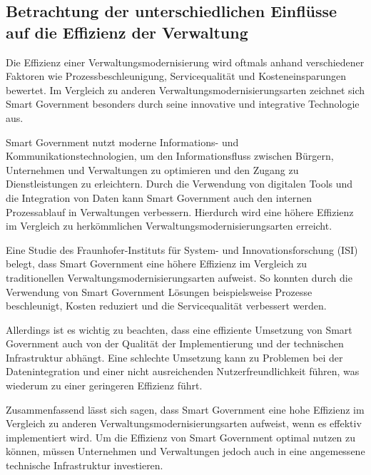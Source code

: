 \subsection{Betrachtung der unterschiedlichen Einflüsse auf die Effizienz der Verwaltung}
Die Effizienz einer Verwaltungsmodernisierung wird oftmals anhand verschiedener Faktoren wie Prozessbeschleunigung, Servicequalität und Kosteneinsparungen bewertet.
Im Vergleich zu anderen Verwaltungsmodernisierungsarten zeichnet sich Smart Government besonders durch seine innovative und integrative Technologie aus.
\par
Smart Government nutzt moderne Informations- und Kommunikationstechnologien, um den Informationsfluss zwischen Bürgern, Unternehmen und Verwaltungen zu optimieren und den Zugang zu Dienstleistungen zu erleichtern.
Durch die Verwendung von digitalen Tools und die Integration von Daten kann Smart Government auch den internen Prozessablauf in Verwaltungen verbessern.
Hierdurch wird eine höhere Effizienz im Vergleich zu herkömmlichen Verwaltungsmodernisierungsarten erreicht.
\par
Eine Studie des Fraunhofer-Instituts für System- und Innovationsforschung (ISI) belegt, dass Smart Government eine höhere Effizienz im Vergleich zu traditionellen Verwaltungsmodernisierungsarten aufweist.
So konnten durch die Verwendung von Smart Government Lösungen beispielsweise Prozesse beschleunigt, Kosten reduziert und die Servicequalität verbessert werden.
\par
Allerdings ist es wichtig zu beachten, dass eine effiziente Umsetzung von Smart Government auch von der Qualität der Implementierung und der technischen Infrastruktur abhängt.
Eine schlechte Umsetzung kann zu Problemen bei der Datenintegration und einer nicht ausreichenden Nutzerfreundlichkeit führen, was wiederum zu einer geringeren Effizienz führt.
\par
Zusammenfassend lässt sich sagen, dass Smart Government eine hohe Effizienz im Vergleich zu anderen Verwaltungsmodernisierungsarten aufweist, wenn es effektiv implementiert wird.
Um die Effizienz von Smart Government optimal nutzen zu können, müssen Unternehmen und Verwaltungen jedoch auch in eine angemessene technische Infrastruktur investieren.
